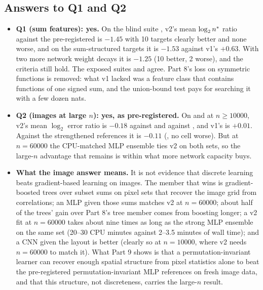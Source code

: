 \subsection{Answers to Q1 and Q2}\label{sec:p9answers}

\begin{itemize}
\item \textbf{Q1 (sum features): yes.} On the blind suite , v2's mean $\log_2n^{*}$ ratio against the pre-registered  is $-1.45$ with 10 targets clearly better and none worse, and on the sum-structured targets it is $-1.53$ against v1's $+0.63$. With two more network weight decays it is $-1.25$ (10 better, 2 worse), and the criteria still hold. The exposed suites  and  agree. Part 8's loss on symmetric functions is removed: what v1 lacked was a feature class that contains functions of one signed sum, and the union-bound test pays for searching it with a few dozen nats.
\item \textbf{Q2 (images at large $n$): yes, as pre-registered.} On  and  at $n\ge10000$, v2's mean $\log_2$ error ratio is $-0.18$ against  and against , and v1's is $+0.01$. Against the strengthened references it is $-0.11$ (, no cell worse). But at $n=60000$ the CPU-matched MLP ensemble ties v2 on both sets, so the large-$n$ advantage that remains is within what more network capacity buys.
\item \textbf{What the image answer means.} It is not evidence that discrete learning beats gradient-based learning on images. The member that wins is gradient-boosted trees over subset sums on pixel sets that recover the image grid from correlations; an MLP given those sums matches v2 at $n=60000$; about half of the trees' gain over Part 8's tree member comes from boosting longer; a v2 fit at $n=60000$ takes about nine times as long as the strong MLP ensemble on the same set (20--30 CPU minutes against 2--3.5 minutes of wall time); and a CNN given the layout is better (clearly so at $n=10000$, where v2 needs $n=60000$ to match it). What Part 9 shows is that a permutation-invariant learner can recover enough spatial structure from pixel statistics alone to beat the pre-registered permutation-invariant MLP references on fresh image data, and that this structure, not discreteness, carries the large-$n$ result.
\end{itemize}

